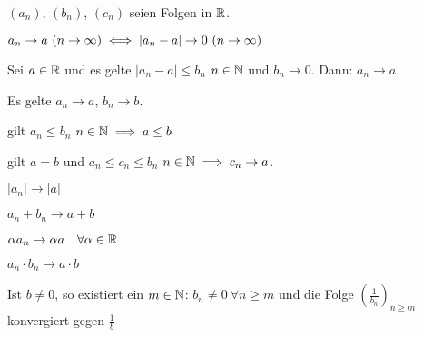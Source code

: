 \documentclass[a4paper,oneside,DIV15,BCOR12mm]{scrbook}
\begin{document}
\begin{satz}[Konvergenzsätze]
$(a_n)$, $(b_n)$, $(c_n)$ seien Folgen in $\mathbb{R}$.
\begin{liste}
\item $a_n \to a \ (n \to \infty) \iff |a_n - a| \to 0 \ (n \to \infty)$
\item Sei $a \in \mathbb{R}$ und es gelte $|a_n - a| \le b_n$ \ffa $n\in\mathbb{N}$ und $b_n \to 0$. Dann: $a_n \to a$.
\item Es gelte $a_n \to a$, $b_n \to b$.
\begin{liste}
\item gilt $a_n \le b_n$ \ffa $n\in\mathbb{N} \implies a \le b$
\item gilt $a=b$ und $a_n \le c_n \le b_n$ \ffa $n\in\mathbb{N} \implies c_n \to a$.
\item $|a_n| \to |a|$
\item $a_n + b_n \to a+b$
\item $\alpha a_n \to \alpha a\quad \forall\alpha \in \mathbb{R}$
\item $a_n \cdot b_n \to a\cdot b$
\item Ist $b \ne 0$, so existiert ein $m\in\mathbb{N}$: $b_n \ne 0\ \forall n\ge m$ und die Folge $(\frac{1}{b_n})_{n\ge m}$ konvergiert gegen $\frac{1}{b}$
\end{liste}
\end{liste}
\end{satz}
\end{document}
